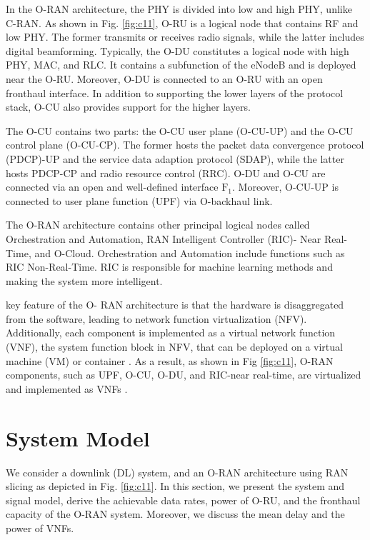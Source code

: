 \documentclass[lettersize,journal]{IEEEtran}
\begin{document}
In the O-RAN architecture, the PHY is divided into low and high PHY, unlike C-RAN. As shown in Fig. \ref{fig:c11}, O-RU is a logical node that contains RF and low PHY. The former transmits or receives radio signals, while the latter includes digital beamforming. Typically, the O-DU constitutes a logical node with high PHY, MAC, and RLC. It contains a subfunction of the eNodeB and is deployed near the O-RU.
Moreover, O-DU is connected to an O-RU with an open fronthaul interface.
In addition to supporting the lower layers of the protocol stack, O-CU also provides support for the higher layers.

The O-CU contains two parts: the O-CU user plane (O-CU-UP) and the O-CU control plane (O-CU-CP). The former hosts the packet data convergence protocol (PDCP)-UP and the service data adaption protocol (SDAP), while the latter hosts PDCP-CP and radio resource control (RRC).
O-DU and O-CU are connected via an open and well-defined interface $\text{F}_1$.
Moreover, O-CU-UP is connected to user plane function (UPF) via O-backhaul link.

The O-RAN architecture contains other principal logical nodes called Orchestration and Automation, RAN Intelligent Controller (RIC)- Near Real-Time, and O-Cloud. Orchestration and Automation include functions such as RIC Non-Real-Time. RIC is responsible for machine learning methods and making the system more intelligent.

 key feature of the O-
RAN architecture is that the hardware is disaggregated from
the software, leading to network function virtualization
(NFV).  Additionally, each component is implemented as a virtual network function (VNF), the system function block in NFV, that can be deployed on a virtual machine (VM) or container \cite{mijumbi2015network}. As a result, as shown in Fig \ref{fig:c11}, O-RAN components, such as UPF, O-CU, O-DU, and RIC-near real-time, are virtualized and implemented as VNFs
\cite{gavrilovska2020cloud,niknam2020intelligent,kazemifard2021minimum,both2021system,ORANArch,ORANML,lin2021toward}. 
\section{System Model}\label{systemmodel}
We consider a downlink (DL) system, and an O-RAN architecture using RAN slicing as depicted in Fig. \ref{fig:c11}.
In this section, we present the system and signal model, derive the achievable data rates, power of O-RU, and the fronthaul capacity  of the O-RAN system. Moreover, we discuss the mean delay and the power of VNFs.
\vspace{-3mm}
\end{document}
